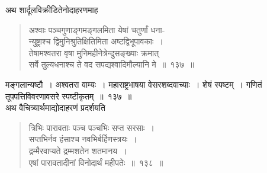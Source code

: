 \documentclass[11pt, openany]{book}
\begin{document}
\vspace{-2mm}
 अथ शार्दूलविक्रीडितेनोदाहरणमाह\textendash

 \label{137}
\begin{quote}
    \eg 
 अश्वाः पञ्चगुणाङ्गमङ्गलमिता येषां चतुर्णां धना- \\
 न्युष्ट्राश्च द्विमुनिश्रुतिक्षितिमिता अष्टद्विभूपावकाः~।\\
\newpage
 तेषामश्वतरा वृषा मुनिमहीनेत्रेन्दुसङ्ख्याः क्रमात् \\
 सर्वे तुल्यधनाश्च ते वद सपद्यश्वादिमौल्यानि मे~॥~१३७~॥
\end{quote}

 मङ्गलान्यष्टौ~। अश्वतरा वाम्यः~। महाराष्ट्रभाषया
वेसरशब्दवाच्याः~। शेषं 
स्पष्टम्~। गणितं तूपपत्तिविवरणावसरे स्पष्टीकृतम्~॥~१३७~॥\\

\vspace{-2mm}
 अथ वैचित्र्यार्थमाद्योदाहरणं प्रदर्शयति\textendash
\begin{quote}
    \eg 
     त्रिभिः पारावताः पञ्च पञ्चभिः सप्त सरसाः~। \\
 सप्तभिर्नव हंसाश्च नवभिर्बर्हिणस्त्रयः~। \\
 द्रम्मैरवाप्यते द्रम्मशतेन शतमानय~। \\
 एषां पारावतादीनां विनोदार्थं महीपतेः~॥~१३८~॥ 
\end{quote}
\end{document}
